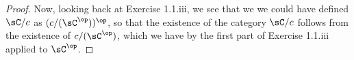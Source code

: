 \documentclass[../../main]{subfiles}
\begin{document}
\begin{proof}
	Now, looking back at Exercise 1.1.iii, we see that we we could have defined
	\(\sC/c\) as \((c/(\sC^\op))^\op\), so that the existence of the category
	\(\sC/c\) follows from the existence of \(c/(\sC^\op)\), which we have by
	the first part of Exercise 1.1.iii applied to \(\sC^\op\).
\end{proof}
\end{document}
